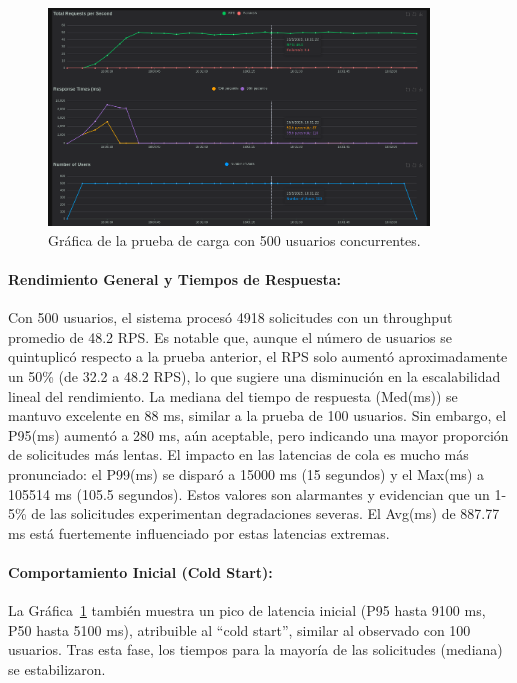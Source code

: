 \begin{figure}[H]
\centering
\includegraphics[width=0.9\textwidth]{figures/08_500_1.png}
\caption{Gráfica de la prueba de carga con 500 usuarios concurrentes.}
\label{fig:locust500}
\end{figure}

\paragraph{Rendimiento General y Tiempos de Respuesta:}
Con 500 usuarios, el sistema procesó 4918 solicitudes con un throughput promedio de 48.2 RPS. Es notable que, aunque el número de usuarios se quintuplicó respecto a la prueba anterior, el RPS solo aumentó aproximadamente un 50\% (de 32.2 a 48.2 RPS), lo que sugiere una disminución en la escalabilidad lineal del rendimiento.
La mediana del tiempo de respuesta (Med(ms)) se mantuvo excelente en 88 ms, similar a la prueba de 100 usuarios. Sin embargo, el P95(ms) aumentó a 280 ms, aún aceptable, pero indicando una mayor proporción de solicitudes más lentas.
El impacto en las latencias de cola es mucho más pronunciado: el P99(ms) se disparó a 15000 ms (15 segundos) y el Max(ms) a 105514 ms (105.5 segundos). Estos valores son alarmantes y evidencian que un 1-5\% de las solicitudes experimentan degradaciones severas. El Avg(ms) de 887.77 ms está fuertemente influenciado por estas latencias extremas.

\paragraph{Comportamiento Inicial (Cold Start):}
La Gráfica~\ref{fig:locust500} también muestra un pico de latencia inicial (P95 hasta 9100 ms, P50 hasta 5100 ms), atribuible al ``cold start'', similar al observado con 100 usuarios. Tras esta fase, los tiempos para la mayoría de las solicitudes (mediana) se estabilizaron.

